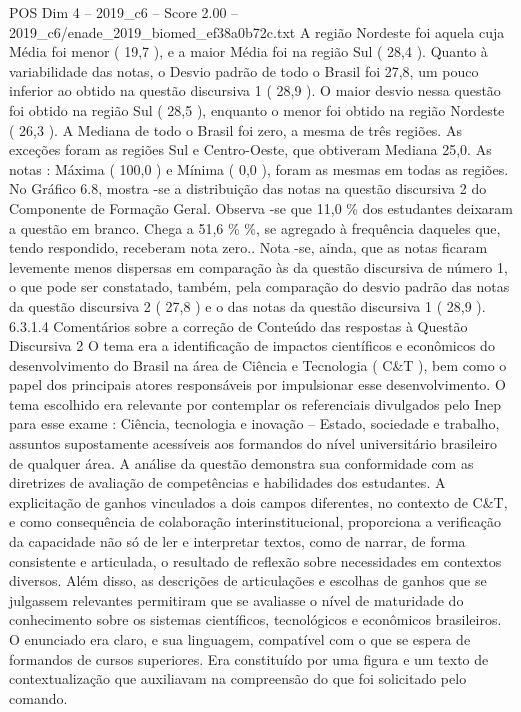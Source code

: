 \begin{textsample}{POS Dim 4 – 2019\_c6 – Score 2.00 – 2019\_c6/enade\_2019\_biomed\_ef38a0b72c.txt}
A região Nordeste foi aquela cuja Média foi menor ( 19,7 ), e a maior Média foi na região Sul ( 28,4 ).
Quanto à variabilidade das notas, o Desvio padrão de todo o Brasil foi 27,8, um pouco inferior ao obtido na questão discursiva 1 ( 28,9 ).
O maior desvio nessa questão foi obtido na região Sul ( 28,5 ), enquanto o menor foi obtido na região Nordeste ( 26,3 ).
A Mediana de todo o Brasil foi zero, a mesma de três regiões.
As exceções foram as regiões Sul e Centro-Oeste, que obtiveram Mediana 25,0.
As notas : Máxima ( 100,0 ) e Mínima ( 0,0 ), foram as mesmas em todas as regiões.
No Gráfico 6.8, mostra -se a distribuição das notas na questão discursiva 2 do Componente de Formação Geral.
Observa -se que 11,0 \% dos estudantes deixaram a questão em branco.
Chega a 51,6 \% \%, se agregado à frequência daqueles que, tendo respondido, receberam nota zero..
Nota -se, ainda, que as notas ficaram levemente menos dispersas em comparação às da questão discursiva de número 1, o que pode ser constatado, também, pela comparação do desvio padrão das notas da questão discursiva 2 ( 27,8 ) e o das notas da questão discursiva 1 ( 28,9 ). 6.3.1.4 Comentários sobre a correção de Conteúdo das respostas à Questão Discursiva 2 O tema era a identificação de impactos científicos e econômicos do desenvolvimento do Brasil na área de Ciência e Tecnologia ( C\&T ), bem como o papel dos principais atores responsáveis por impulsionar esse desenvolvimento.
O tema escolhido era relevante por contemplar os referenciais divulgados pelo Inep para esse exame : Ciência, tecnologia e inovação – Estado, sociedade e trabalho, assuntos supostamente acessíveis aos formandos do nível universitário brasileiro de qualquer área.
A análise da questão demonstra sua conformidade com as diretrizes de avaliação de competências e habilidades dos estudantes.
A explicitação de ganhos vinculados a dois campos diferentes, no contexto de C\&T, e como consequência de colaboração interinstitucional, proporciona a verificação da capacidade não só de ler e interpretar textos, como de narrar, de forma consistente e articulada, o resultado de reflexão sobre necessidades em contextos diversos.
Além disso, as descrições de articulações e escolhas de ganhos que se julgassem relevantes permitiram que se avaliasse o nível de maturidade do conhecimento sobre os sistemas científicos, tecnológicos e econômicos brasileiros.
O enunciado era claro, e sua linguagem, compatível com o que se espera de formandos de cursos superiores.
Era constituído por uma figura e um texto de contextualização que auxiliavam na compreensão do que foi solicitado pelo comando.

\end{textsample}
